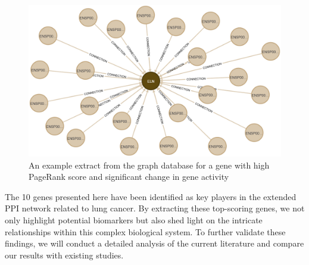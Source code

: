\begin{figure}[h]
    \centering
    \includegraphics[height=\dfheightdouble]{figures/04_example_gene}
    \caption{An example extract from the graph database for a gene with high PageRank score and significant change in gene activity}
    \label{fig:04_example_gene}
\end{figure}

The 10 genes presented here have been identified as key players in the extended PPI network related to lung cancer.
By extracting these top-scoring genes, we not only highlight potential biomarkers but also
shed light on the intricate relationships within this complex biological system.
To further validate these findings, we will conduct a detailed analysis of the current literature and compare our results with existing studies.
